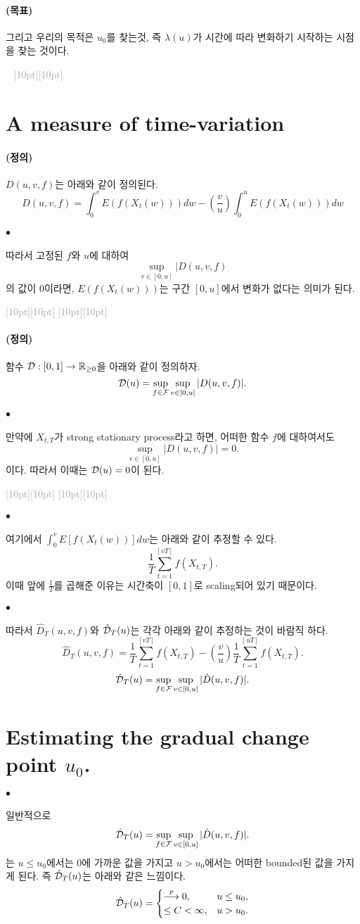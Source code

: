 \documentclass[12pt,oneside,english]{book}
\newcommand{\dash}{\vspace{2em}\noindent \textcolor{darkgray}{\hrulefill~ \raisebox{-2.5pt}[10pt][10pt]{\leafright \decofourleft \decothreeleft  \aldineright \decotwo \floweroneleft \decoone   \floweroneright \decotwo \aldineleft\decothreeright \decofourright \leafleft} ~  \hrulefill \\ \vspace{2em}}}
\newcommand{\rdash}{\noindent \textcolor{darkgray}{ \raisebox{-1.9pt}[10pt][10pt]{\leafright} \hrulefill \raisebox{-1.9pt}[10pt][10pt]{\leafright \decofourleft \decothreeleft  \aldineright \decotwo \floweroneleft \decoone}}}
\def\ck{\paragraph{\large$\bullet$}\large}
\def\goal{\paragraph{\large(목표)}\large}
\def\dfn{\paragraph{\large(정의)}\large}
\begin{document}
\goal 그리고 우리의 목적은 $u_0$를 찾는것, 즉 $\lambda(u)$가 시간에 따라 변화하기 시작하는 시점을 찾는 것이다. 


\dash

\section{A measure of time-variation}

\dfn 
$D(u,v,f)$는 아래와 같이 정의된다. 
\[
D(u,v,f)=\int_0^v E(f(X_t(w)))dw-\left(\frac{v}{u}\right) \int_0^u E(f(X_t(w)))dw
\]

\ck 
따라서 고정된 $f$와 $u$에 대하여 
\[
\sup_{v\in[0,u]}|D(u,v,f)
\]
의 값이 0이라면, $E(f(X_t(w)))$는 구간 $[0,u]$에서 변화가 없다는 의미가 된다. 

\rdash

\dfn 
함수 ${\cal D}:[0,1] \rightarrow \mathbb{R}_{\geq 0}$을 아래와 같이 정의하자. 	
$${\cal D}(u)=\sup_{f \in {\cal F}}\sup_{v \in [0,u]} |D(u,v,f)|.$$

\ck 만약에 $X_{t,T}$가 strong stationary process라고 하면, 어떠한 함수 $f$에 대하여서도 
\[
\sup_{v \in [0,u]}|D(u,v,f)|=0.
\]
이다. 따라서 이때는 ${\cal D}(u)=0$이 된다. 

\rdash 

\ck 여기에서 $\int_0^vE[f(X_t(w))]dw$는 아래와 같이 추정할 수 있다. 
$$\frac{1}{T}\sum_{t=1}^{[vT]}f(X_{t,T}).$$
이때 앞에 $\frac{1}{T}$를 곱해준 이유는 시간축이 $[0,1]$로 scaling되어 있기 때문이다. 

\ck 따라서 $\hat{D}_T(u,v,f)$와 $\hat{\cal D}_T(u)$는 각각 아래와 같이 추정하는 것이 바람직 하다. 
$$\hat{D}_T(u,v,f)=\frac{1}{T}\sum_{t=1}^{[vT]}f(X_{t,T})-\left(\frac{v}{u}\right) \frac{1}{T} \sum_{t=1}^{[uT]}f(X_{t,T}).$$
$$\hat{\cal D}_T(u)=\sup_{f \in {\cal F}}\sup_{v \in [0,u]} |\hat{D}(u,v,f)|.$$

\section{Estimating the gradual change point $u_0$.}

\ck 일반적으로 
$$\hat{\cal D}_T(u)=\sup_{f \in {\cal F}}\sup_{v \in [0,u]} |\hat{D}(u,v,f)|.$$
는 $u\leq u_0$에서는 0에 가까운 값을 가지고 $u>u_0$에서는 어떠한 bounded된 값을 가지게 된다. 즉 $\hat{\cal D}_T(u)$는 아래와 같은 느낌이다. 
$$\hat{\cal D}_T(u)=\begin{cases}
\overset{p}{\longrightarrow} 0 ,& u\leq u_0, \\ 
\leq C < \infty, & u>u_0.
\end{cases}$$
\end{document}
